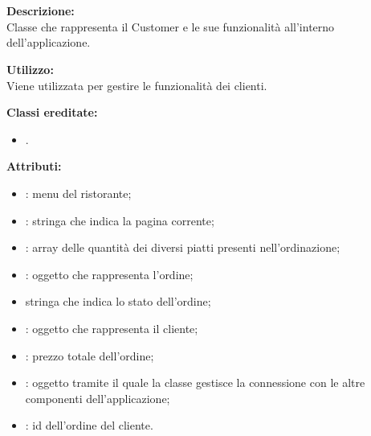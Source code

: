 \paragraph[::CustomerBubble]{\class}\mbox{}\\ \label{\class}
\textbf{Descrizione:}\\
Classe che rappresenta il Customer e le sue funzionalità all'interno dell'applicazione.

\textbf{Utilizzo:}\\
Viene utilizzata per gestire le funzionalità dei clienti.

\textbf{Classi ereditate:}
\begin{itemize}
	\item {}.
\end{itemize}


\textbf{Attributi:}
\begin{itemize}
	\item {}: menu del ristorante;
	\item {}: stringa che indica la pagina corrente;
	\item {}: array delle quantità dei diversi piatti presenti nell'ordinazione;
	\item {}: oggetto che rappresenta l'ordine;
	\item {} stringa che indica lo stato dell'ordine;
	\item {}: oggetto che rappresenta il cliente;
	\item {}: prezzo totale dell'ordine;
	\item {}: oggetto tramite il quale la classe gestisce la connessione con le altre componenti dell'applicazione;
	\item {}: id dell'ordine del cliente.
\end{itemize}

